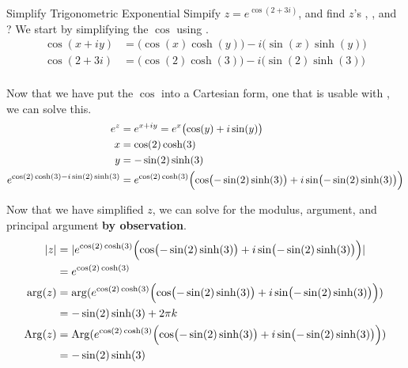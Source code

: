 \begin{example}[Lecture 3]{Simplify Trigonometric Exponential}
  Simpify $z = e^{\cos(2 + 3i)}$, and find $z$'s , , and ?
  \tcblower{}
  We start by simplifying the $\cos$ using .
  \begin{align*}
    \cos(x + iy) &= \bigl( \cos(x) \cosh(y) \bigr) - i \bigl( \sin(x) \sinh(y) \bigr) \\
    \cos(2 + 3i) &= \bigl( \cos(2) \cosh(3) \bigr) - i \bigl( \sin(2) \sinh(3) \bigr) \\
  \end{align*}

  Now that we have put the $\cos$ into a Cartesian form, one that is usable with , we can solve this.
  \begin{align*}
    e^{z} &= e^{x + iy} = e^{x} \bigl( \cos(y) + i \sin(y) \bigr) \\
    x &= \cos(2) \cosh(3) \\
    y &= -\sin(2) \sinh(3) \\
    e^{\cos(2) \cosh(3) - i \sin(2) \sinh(3)} &= e^{\cos(2) \cosh(3)} \Bigl( \cos \bigl( -\sin(2) \sinh(3) \bigr) + i \sin \bigl( -\sin(2) \sinh(3) \bigr) \Bigr)
  \end{align*}

  Now that we have simplified $z$, we can solve for the modulus, argument, and principal argument \textbf{by observation}.
  \begin{align*}
    \lvert z \rvert &= \lvert e^{\cos(2) \cosh(3)} \Bigl( \cos \bigl( -\sin(2) \sinh(3) \bigr) + i \sin \bigl( -\sin(2) \sinh(3) \bigr) \Bigr) \rvert \\
                &= e^{\cos(2) \cosh(3)} \\
    \arg(z) &= \arg(e^{\cos(2) \cosh(3)} \Bigl( \cos \bigl( -\sin(2) \sinh(3) \bigr) + i \sin \bigl( -\sin(2) \sinh(3) \bigr) \Bigr)) \\
                &= -\sin(2) \sinh(3) + 2\pi k \\
    \operatorname{Arg}(z) &= \operatorname{Arg}(e^{\cos(2) \cosh(3)} \Bigl( \cos \bigl( -\sin(2) \sinh(3) \bigr) + i \sin \bigl( -\sin(2) \sinh(3) \bigr) \Bigr)) \\
                &= -\sin(2) \sinh(3) \\
  \end{align*}
\end{example}

